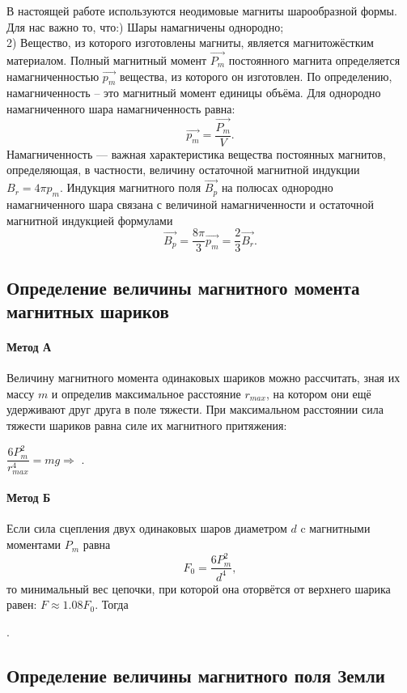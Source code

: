 	В настоящей работе используются неодимовые магниты шарообразной формы.
Для нас важно то, что:\n{}) Шары намагничены однородно;\\
2) Вещество, из которого изготовлены магниты, является магнитожёстким материалом.\n\n
Полный магнитный момент $\overrightarrow{P_m}$
постоянного магнита определяется намагниченностью $\overrightarrow{p_m}$
вещества, из которого он изготовлен. По определению, намагниченность – это магнитный момент единицы объёма. Для однородно намагниченного шара намагниченность равна:
$$
\overrightarrow{p_m}=\dfrac{\overrightarrow{P_m}}{V}.
$$
Намагниченность — важная характеристика вещества постоянных магнитов, определяющая, в
частности, величину остаточной магнитной индукции $B_r = 4\pi p_m$. Индукция магнитного поля $\overrightarrow{B_p}$
на полюсах однородно намагниченного шара связана с величиной намагниченности и остаточной магнитной индукцией формулами
$$
\overrightarrow{B_p}=\dfrac{8\pi}{3}\overrightarrow{p_m}=\dfrac{2}{3}\overrightarrow{B_r}.
$$
\subsection*{Определение величины магнитного момента магнитных шариков}
\paragraph*{Метод А}\n
Величину магнитного момента одинаковых шариков
можно рассчитать, зная их массу $m$ и определив максимальное расстояние $r_{max}$, на котором они ещё удерживают друг
друга в поле тяжести. При максимальном расстоянии сила тяжести шариков равна силе их магнитного притяжения:
\begin{center}
$\dfrac{6P_m^2}{r_{max}^4}=mg\Rightarrow$ .
\end{center}
\paragraph*{Метод Б}\n
Если сила сцепления двух одинаковых шаров диаметром $d$ c магнитными моментами $P_m$ равна
$$
F_0 = \dfrac{6P_m^2}{d^4},
$$
то минимальный вес цепочки, при которой она оторвётся от верхнего шарика равен: $F \approx 1.08 F_0$. Тогда
\begin{center}
.
\end{center}
\subsection*{Определение величины магнитного поля Земли}
